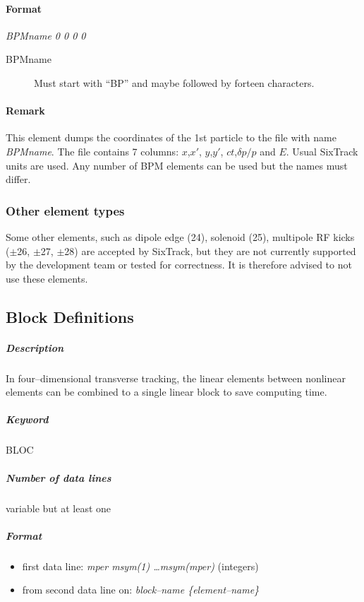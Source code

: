 \paragraph{Format} {\em BPMname 0 0 0 0}
\begin{description}
\item [BPMname] Must start with ``BP'' and maybe followed by forteen characters.
\end{description}

\paragraph{Remark}
This element dumps the coordinates of the 1st particle to the file with name {\em BPMname}.
The file contains 7 columns: $x$,$x'$, $y$,$y'$, $ct$,$\delta p/p$ and $E$.
Usual SixTrack units are used. Any number of BPM elements can be used but
the names must differ. 

\subsubsection{Other element types}

Some other elements, such as dipole edge (24), solenoid (25), multipole RF kicks ($\pm$26, $\pm$27, $\pm$28) are accepted by SixTrack, but they are not currently supported by the development team or tested for correctness.
It is therefore advised to not use these elements.

\subsection{Block Definitions} \label{BloDef}

\subparagraph{Description} In four--dimensional transverse tracking,
the linear elements between nonlinear elements can be combined to a
single linear block to save computing time.

\subparagraph{Keyword} BLOC \subparagraph{Number of data lines}
variable but at least one

\subparagraph{Format}
\begin{itemize}
\item first data line: {\em mper msym(1) \dots msym(mper)}
  \/(integers)
\item from second data line on: {\em block--name \{element--name\} }
\end{itemize}

